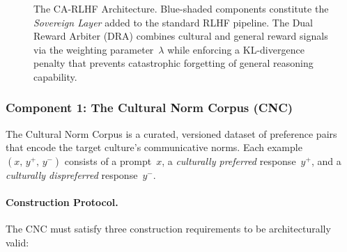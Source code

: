 \begin{figure}[ht]
\caption{The CA-RLHF Architecture.
  Blue-shaded components constitute the \emph{Sovereign Layer}
  added to the standard RLHF pipeline.
  The Dual Reward Arbiter (DRA) combines cultural and general reward
  signals via the weighting parameter~$\lambda$ while enforcing a
  KL-divergence penalty that prevents catastrophic forgetting of
  general reasoning capability.}
\label{fig:ca-rlhf-architecture}
\end{figure}

\subsubsection{Component 1: The Cultural Norm Corpus (CNC)}
\label{subsubsec:cnc}

The Cultural Norm Corpus is a curated, versioned dataset of
preference pairs that encode the target culture's communicative
norms.
Each example $(x,\, y^{+},\, y^{-})$ consists of a prompt~$x$, a
\emph{culturally preferred} response~$y^{+}$, and a
\emph{culturally dispreferred} response~$y^{-}$.

\paragraph{Construction Protocol.}
The CNC must satisfy three construction requirements to be
architecturally valid:

